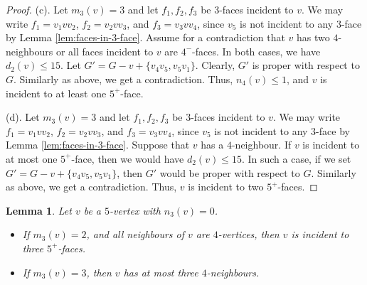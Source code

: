 \documentclass[12pt, reqno]{amsart}
\theoremstyle{plain}
\newtheorem{lemma}[equation]{Lemma}
\theoremstyle{definition}
\numberwithin{equation}{section}
\begin{document}
\begin{proof}
(c). Let $m_3(v)=3$ and let $f_1,f_2,f_3$ be $3$-faces incident to $v$. We may write $f_1=v_1vv_2$, $f_2=v_2vv_3$, and $f_3=v_3vv_4$, since $v_5$ is not incident to any $3$-face by  Lemma \ref{lem:faces-in-3-face}. Assume for a contradiction that $v$ has two $4$-neighbours or all faces incident to $v$ are $4^-$-faces. In both cases, we  have $d_2(v)\leq 15$. Let $G'=G-v+\{v_4v_5,v_5v_1\}$.  Clearly, $G'$ is proper with respect to $G$. Similarly as above, we get a contradiction.  Thus, $n_4(v)\leq 1$, and $v$ is incident to at least one $5^+$-face. 

(d). Let $m_3(v)=3$ and let $f_1,f_2,f_3$ be $3$-faces incident to $v$. We may write $f_1=v_1vv_2$, $f_2=v_2vv_3$, and $f_3=v_3vv_4$, since $v_5$ is not incident to any $3$-face by  Lemma \ref{lem:faces-in-3-face}. Suppose that $v$ has a $4$-neighbour. If $v$ is incident to at most one $5^+$-face, then we would have $d_2(v)\leq 15$.  In such a case, if we set $G'=G-v+\{v_4v_5,v_5v_1\}$, then $G'$ would be proper with respect to $G$. Similarly as above, we get a contradiction. Thus, $v$ is incident to two $5^+$-faces. 
\end{proof}



\begin{lemma}\label{lem:5-vertex-n3-0}
Let $v$ be a $5$-vertex with $n_3(v)= 0$. 
\begin{itemize}
\item[$(a)$] If $m_3(v)=2$, and all neighbours of $v$ are $4$-vertices, then  $v$ is incident to three $5^+$-faces.
\item[$(b)$] If $m_3(v)=3$, then  $v$ has at  most three $4$-neighbours.
\end{itemize}
\end{lemma}
\end{document}
